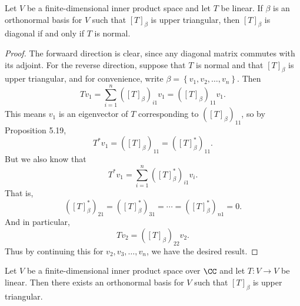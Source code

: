 \documentclass[linearalgebraII]{subfiles}
\begin{document}
    \begin{prop}{}
        Let $V$ be a finite-dimensional inner product space and let $T$ be linear. If $\beta$ is an orthonormal basis for $V$ such that $\left[ T \right] _\beta$ is upper triangular, then $\left[ T \right] _\beta$ is diagonal if and only if $T$ is normal.
    \end{prop}

    \begin{proof}
        The forwaard direction is clear, since any diagonal matrix commutes with its adjoint. For the reverse direction, suppose that $T$ is normal and that $\left[ T \right] _\beta$ is upper triangular, and for convenience, write $\beta = \left\lbrace v_1,v_2,\ldots,v_n \right\rbrace$. Then
        \begin{equation*}
            Tv_1 = \sum^{n}_{i=1} \left( \left[ T \right] _\beta \right) _{i1}v_1= \left( \left[ T \right] _\beta \right) _{11}v_1.
        \end{equation*}
        This means $v_1$ is an eigenvector of $T$ corresponding to $\left( \left[ T \right] _\beta \right) _{11}$, so by Proposition 5.19,
        \begin{equation*}
            T^*v_1 = \left( \left[ T \right] _\beta \right) _{11} = \left( \left[ T \right] ^*_\beta \right) _{11}.
        \end{equation*}
        But we also know that
        \begin{equation*}
            T^*v_1 = \sum^{n}_{i=1} \left( \left[ T \right] _\beta^* \right) _{i1}v_i.
        \end{equation*}
        That is,
        \begin{equation*}
            \left( \left[ T \right] _\beta^* \right) _{21} = \left( \left[ T \right] _\beta^* \right) _{31} = \cdots = \left( \left[ T \right] _\beta^* \right) _{n1} = 0.
        \end{equation*}
        And in particular,
        \begin{equation*}
            Tv_2 = \left( \left[ T \right] _\beta \right) _{22}v_2.
        \end{equation*}
        Thus by continuing this for $v_2,v_3,\ldots,v_n$, we have the desired result.
    \end{proof}

    \begin{prop}{}
        Let $V$ be a finite-dimensional inner product space over $\CC$ and let $T:V\to V$ be linear. Then there exists an orthonormal basis for $V$ such that $\left[ T \right] _\beta$ is upper triangular.
    \end{prop}
\end{document}
